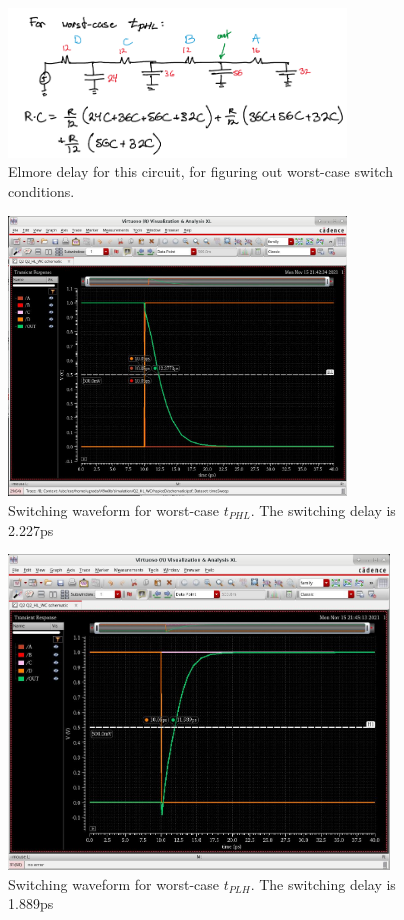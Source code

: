 \documentclass[11pt]{article}
\begin{document}
\begin{figure}[H]
\centering
  \includegraphics[width=0.8\textwidth]{elmore.png}
  \caption{Elmore delay for this circuit, for figuring out worst-case switch conditions.}
\end{figure}


\begin{figure}[H]
\centering
  \includegraphics[width=0.8\textwidth]{wctphl.png}
  \caption{Switching waveform for worst-case $t_{PHL}$. The switching delay is 2.227ps}
\end{figure}


\begin{figure}[H]
\centering
  \includegraphics[width=0.9\textwidth]{wctplh.png}
  \caption{Switching waveform for worst-case $t_{PLH}$. The switching delay is 1.889ps}
\end{figure}
\end{document}
